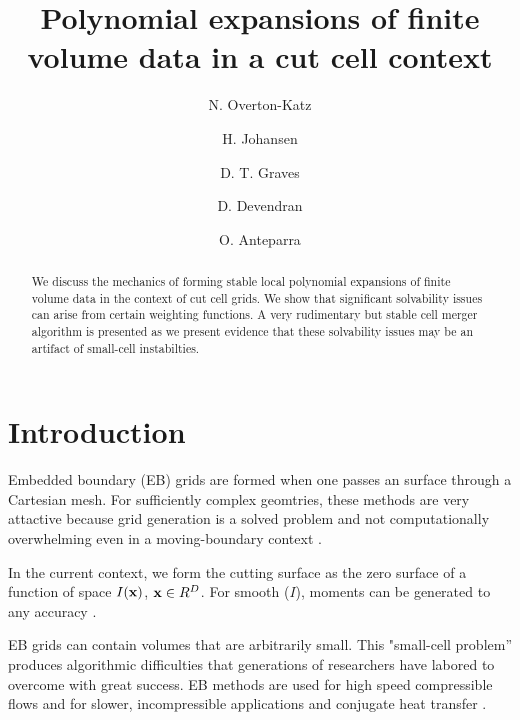 \documentclass{article}
\newcommand{\xbold}{{\bf x}}
\begin{document}
\title{Polynomial expansions of finite volume data in a cut cell context}
\author{N. Overton-Katz \footnotemark[1]
   \and H. Johansen     \footnotemark[1]
   \and D. T. Graves    \footnotemark[1]
   \and D. Devendran    \footnotemark[2]
   \and O. Anteparra    \footnotemark[1]}

\maketitle

\begin{abstract}

  We discuss the mechanics of forming stable local polynomial
  expansions of finite volume data in the context of cut cell grids.
  We show that significant solvability issues can arise from certain weighting
  functions.    A very rudimentary but stable cell merger algorithm is
  presented as we present evidence that these solvability issues may be
  an artifact of small-cell instabilties.
  
\end{abstract}


\section{Introduction}

Embedded boundary (EB) grids are formed when one passes an  surface
through a Cartesian mesh.    For sufficiently complex geomtries, these methods
are very attactive because grid generation is a solved problem
and not computationally overwhelming even in a moving-boundary context
\cite{MillerTrebotich2012}.

In the current context, we form the cutting surface as the zero
surface of a function  of space $I(\xbold)$, $\xbold \in R^D$.
For smooth ($I$),  moments can be generated to any
accuracy \cite{Schwartz2015}.

EB grids can contain volumes that are arbitrarily small.    This
"small-cell problem'' produces
algorithmic difficulties that generations of researchers have labored
to overcome with great success.   EB methods are used for high speed
compressible flows \cite{Colella2006, Graves2013} and for
slower, incompressible applications \cite{Trebotich2015} and conjugate
heat transfer \cite{Crockett2010}.
\end{document}
